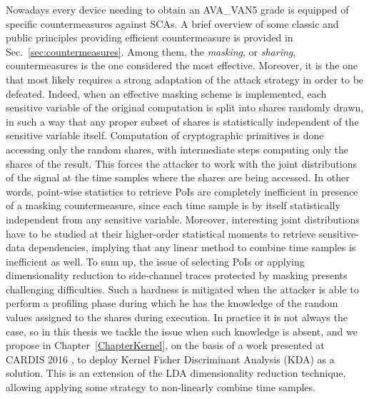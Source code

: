 Nowadays every device needing to obtain an AVA\_VAN5 grade is equipped of specific countermeasures against SCAs. A brief overview of some classic and public principles providing efficient countermeasure is provided in Sec.~\ref{sec:countermeasures}. Among them, the \emph{masking}, or \emph{sharing}, countermeasures is the one considered the most effective. Moreover, it is the one that most likely requires a strong adaptation of the attack strategy in order to be defeated. Indeed, when an effective masking scheme is implemented, each sensitive variable of the original computation is split into shares randomly drawn, in such a way that any proper subset
of shares is statistically independent of the sensitive variable itself. Computation of cryptographic primitives is done
accessing only the random shares, with intermediate steps computing only the shares of the result. This forces the attacker to work with the joint distributions of the signal at the time samples where the shares are being accessed. In other words, point-wise statistics to retrieve PoIs are completely inefficient in presence of a masking countermeasure, since each time sample is by itself statistically independent from any sensitive variable. Moreover, interesting joint distributions have to be studied at their higher-order statistical moments to retrieve sensitive-data dependencies, implying that any linear method to combine time samples is inefficient as well. To sum up, the issue of selecting PoIs or applying dimensionality reduction to side-channel traces protected by masking presents challenging difficulties. Such a hardness is mitigated when the attacker is able to perform a profiling phase during which he has the knowledge of the random values assigned to the shares during execution. In practice it is not always the case, so in this thesis we tackle the issue when such knowledge is absent, and we propose in Chapter~\ref{ChapterKernel}, on the basis of a work presented at CARDIS 2016 \cite{cagli2016kernel}, to deploy Kernel Fisher Discriminant Analysis (KDA) as a solution. This is an extension of the LDA dimensionality reduction technique, allowing applying some strategy to  non-linearly combine time samples. 

